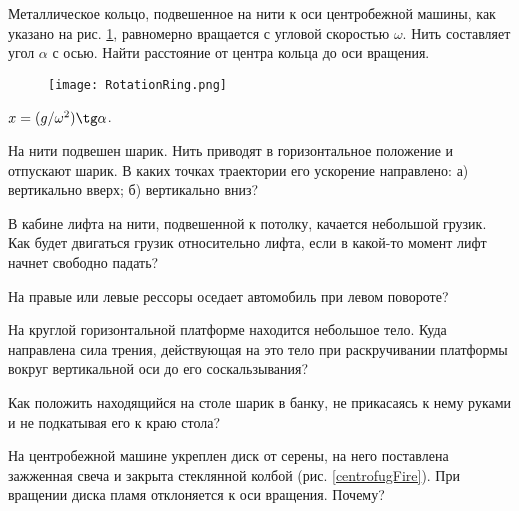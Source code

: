 \begin{ex} %
Металлическое кольцо, подвешенное на нити к оси центробежной машины, как указано на рис. \ref{RotationRing}, равномерно вращается с угловой скоростью $\omega$. Нить составляет угол $\alpha$ с осью. Найти расстояние от центра кольца до оси вращения.

\begin{figure}
\centering
\texttt{[image: RotationRing.png]}
\caption{}
\label{RotationRing}
\end{figure}

\begin{ans}
$x = (g/\omega^2) \tg \alpha$.
\end{ans}
\end{ex}	

\qualProblems

\begin{ex}
На нити подвешен шарик. Нить приводят в горизонтальное положение и отпускают шарик. В каких точках траектории его ускорение направлено: а) вертикально вверх; б) вертикально вниз?
\end{ex}	

\begin{ex}
В кабине лифта на нити, подвешенной к потолку, качается небольшой грузик. Как будет двигаться грузик относительно лифта, если в какой-то момент лифт начнет свободно падать?
\end{ex}	

\begin{ex}
На правые или левые рессоры оседает автомобиль при левом повороте?
\end{ex}	

\begin{ex}
На круглой горизонтальной платформе находится небольшое тело. Куда направлена сила трения, действующая на это тело при раскручивании платформы вокруг вертикальной оси до его соскальзывания?
\end{ex}	

\begin{ex}
Как положить находящийся на столе шарик в банку, не прикасаясь к нему руками и не подкатывая его к краю стола?
\end{ex}	

\begin{ex}
На центробежной машине укреплен диск от серены, на него поставлена зажженная свеча и закрыта стеклянной колбой (рис. \ref{centrofugFire}). При вращении диска пламя отклоняется к оси вращения. Почему?
\end{ex}	

